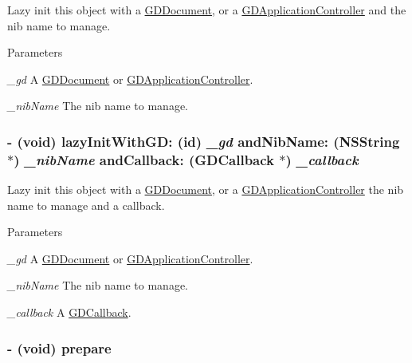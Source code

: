 Lazy init this object with a \hyperlink{interface_g_d_document}{GDDocument}, or a \hyperlink{interface_g_d_application_controller}{GDApplicationController} and the nib name to manage. 
\begin{DoxyParams}{Parameters}
\item[{\em \_\-gd}]A \hyperlink{interface_g_d_document}{GDDocument} or \hyperlink{interface_g_d_application_controller}{GDApplicationController}. \item[{\em \_\-nibName}]The nib name to manage. \end{DoxyParams}
\hypertarget{interface_g_d_external_nib_controller_adfdd072ce438169e09f1ee61d227222c}{
\subsubsection[{lazyInitWithGD:andNibName:andCallback:}]{\setlength{\rightskip}{0pt plus 5cm}-\/ (void) lazyInitWithGD: (id) {\em \_\-gd}\/ andNibName: ({\bf NSString} $\ast$) {\em \_\-nibName}\/ andCallback: ({\bf GDCallback} $\ast$) {\em \_\-callback}}}
\label{interface_g_d_external_nib_controller_adfdd072ce438169e09f1ee61d227222c}


Lazy init this object with a \hyperlink{interface_g_d_document}{GDDocument}, or a \hyperlink{interface_g_d_application_controller}{GDApplicationController} the nib name to manage and a callback. 
\begin{DoxyParams}{Parameters}
\item[{\em \_\-gd}]A \hyperlink{interface_g_d_document}{GDDocument} or \hyperlink{interface_g_d_application_controller}{GDApplicationController}. \item[{\em \_\-nibName}]The nib name to manage. \item[{\em \_\-callback}]A \hyperlink{interface_g_d_callback}{GDCallback}. \end{DoxyParams}
\hypertarget{interface_g_d_external_nib_controller_a362ec726c2ae1d8239f8ea966b2d40b0}{
\subsubsection[{prepare}]{\setlength{\rightskip}{0pt plus 5cm}-\/ (void) prepare }}
\label{interface_g_d_external_nib_controller_a362ec726c2ae1d8239f8ea966b2d40b0}


